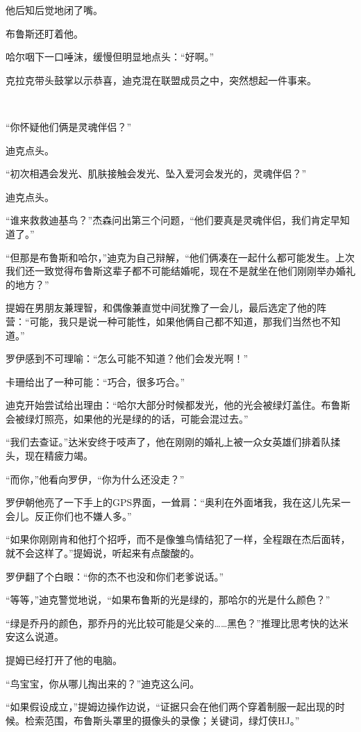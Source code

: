 \documentclass[../main.tex]{subfiles}
\begin{document}
他后知后觉地闭了嘴。

布鲁斯还盯着他。

哈尔咽下一口唾沫，缓慢但明显地点头：“好啊。”

克拉克带头鼓掌以示恭喜，迪克混在联盟成员之中，突然想起一件事来。

~\

“你怀疑他们俩是灵魂伴侣？”

迪克点头。

“初次相遇会发光、肌肤接触会发光、坠入爱河会发光的，灵魂伴侣？”

迪克点头。

“谁来救救迪基鸟？”杰森问出第三个问题，“他们要真是灵魂伴侣，我们肯定早知道了。”

“但那是布鲁斯和哈尔，”迪克为自己辩解，“他们俩凑在一起什么都可能发生。上次我们还一致觉得布鲁斯这辈子都不可能结婚呢，现在不是就坐在他们刚刚举办婚礼的地方？”

提姆在男朋友兼理智，和偶像兼直觉中间犹豫了一会儿，最后选定了他的阵营：“可能，我只是说一种可能性，如果他俩自己都不知道，那我们当然也不知道。”

罗伊感到不可理喻：“怎么可能不知道？他们会发光啊！”

卡珊给出了一种可能：“巧合，很多巧合。”

迪克开始尝试给出理由：“哈尔大部分时候都发光，他的光会被绿灯盖住。布鲁斯会被绿灯照亮，如果他的光是绿的的话，可能会混过去。”

“我们去查证。”达米安终于吱声了，他在刚刚的婚礼上被一众女英雄们排着队揉头，现在精疲力竭。

“而你，”他看向罗伊，“你为什么还没走？”

罗伊朝他亮了一下手上的GPS界面，一耸肩：“奥利在外面堵我，我在这儿先呆一会儿。反正你们也不嫌人多。”

“如果你刚刚肯和他打个招呼，而不是像雏鸟情结犯了一样，全程跟在杰后面转，就不会这样了。”提姆说，听起来有点酸酸的。

罗伊翻了个白眼：“你的杰不也没和你们老爹说话。”

“等等，”迪克警觉地说，“如果布鲁斯的光是绿的，那哈尔的光是什么颜色？”

“绿是乔丹的颜色，那乔丹的光比较可能是父亲的……黑色？”推理比思考快的达米安这么说道。

提姆已经打开了他的电脑。

“鸟宝宝，你从哪儿掏出来的？”迪克这么问。

“如果假设成立，”提姆边操作边说，“证据只会在他们两个穿着制服一起出现的时候。检索范围，布鲁斯头罩里的摄像头的录像；关键词，绿灯侠HJ。”
\end{document}
